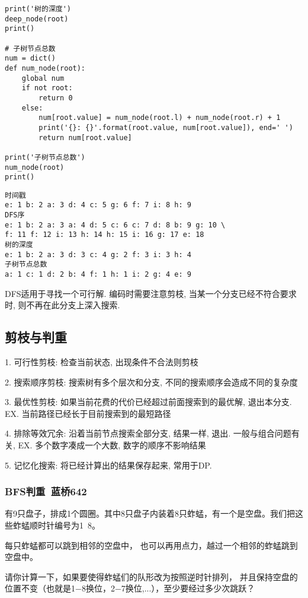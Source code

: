 \documentclass[../main]{subfiles}
\begin{document}
\begin{sloppy}
\begin{lstlisting}[style = Python]
print('树的深度')
deep_node(root)
print()

# 子树节点总数
num = dict()
def num_node(root):
    global num
    if not root:
        return 0
    else:
        num[root.value] = num_node(root.l) + num_node(root.r) + 1
        print('{}: {}'.format(root.value, num[root.value]), end=' ')
        return num[root.value]

print('子树节点总数')
num_node(root)
print()
            \end{lstlisting}

\begin{verbatim}
时间戳
e: 1 b: 2 a: 3 d: 4 c: 5 g: 6 f: 7 i: 8 h: 9 
DFS序
e: 1 b: 2 a: 3 a: 4 d: 5 c: 6 c: 7 d: 8 b: 9 g: 10 \
f: 11 f: 12 i: 13 h: 14 h: 15 i: 16 g: 17 e: 18 
树的深度
e: 1 b: 2 a: 3 d: 3 c: 4 g: 2 f: 3 i: 3 h: 4 
子树节点总数
a: 1 c: 1 d: 2 b: 4 f: 1 h: 1 i: 2 g: 4 e: 9 
\end{verbatim}
            
            
        
            DFS适用于寻找一个可行解. 编码时需要注意剪枝, 当某一个分支已经不符合要求时, 则不再在此分支上深入搜索. 


\newpage
\subsection{剪枝与判重}
    1. 可行性剪枝: 检查当前状态, 出现条件不合法则剪枝

    2. 搜索顺序剪枝: 搜索树有多个层次和分支, 不同的搜索顺序会造成不同的复杂度

    3. 最优性剪枝: 如果当前花费的代价已经超过前面搜索到的最优解, 退出本分支. EX. 当前路径已经长于目前搜索到的最短路径

    4. 排除等效冗余: 沿着当前节点搜索全部分支, 结果一样, 退出. 一般与组合问题有关, EX. 多个数字凑成一个大数, 数字的顺序不影响结果

    5. 记忆化搜索: 将已经计算出的结果保存起来, 常用于DP.

    \subsubsection{BFS判重\ 蓝桥642}

有9只盘子，排成1个圆圈。其中8只盘子内装着8只蚱蜢，有一个是空盘。我们把这些蚱蜢顺时针编号为1~8。

每只蚱蜢都可以跳到相邻的空盘中， 也可以再用点力，越过一个相邻的蚱蜢跳到空盘中。

请你计算一下，如果要使得蚱蜢们的队形改为按照逆时针排列， 并且保持空盘的位置不变（也就是1−8换位，2−7换位,...），至少要经过多少次跳跃？


\end{sloppy}
\end{document}
